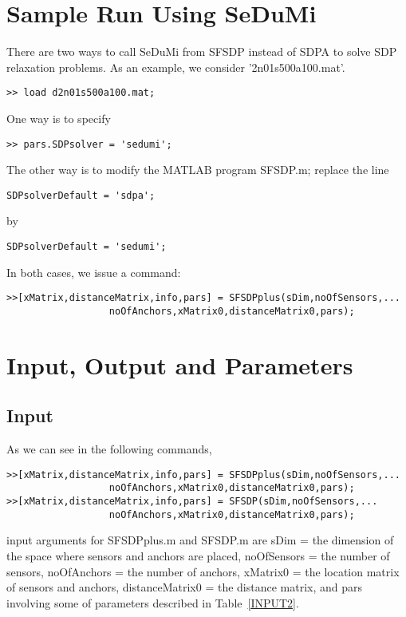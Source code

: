 \documentclass[12pt]{article}
\begin{document}
\section{Sample Run Using SeDuMi}
\label{SDPA}

There are two ways to call SeDuMi \cite{STURM99} from SFSDP instead of SDPA 
to solve SDP relaxation problems.  
As an example, we consider '2n01s500a100.mat'.
\begin{verbatim}
>> load d2n01s500a100.mat;
\end{verbatim}
One way is to specify 
\begin{verbatim}
>> pars.SDPsolver = 'sedumi'; 
\end{verbatim}
The other way is to modify the MATLAB program SFSDP.m;  replace the line 
\begin{verbatim}
SDPsolverDefault = 'sdpa';
\end{verbatim}
by 
\begin{verbatim}
SDPsolverDefault = 'sedumi';
\end{verbatim}
In both cases, we issue a command:
\begin{verbatim}
>>[xMatrix,distanceMatrix,info,pars] = SFSDPplus(sDim,noOfSensors,...
                  noOfAnchors,xMatrix0,distanceMatrix0,pars);
\end{verbatim}


\section{Input, Output and Parameters}
\label{IOP}

\subsection{Input}

As we can see in the following commands,
\begin{verbatim}
>>[xMatrix,distanceMatrix,info,pars] = SFSDPplus(sDim,noOfSensors,...
                  noOfAnchors,xMatrix0,distanceMatrix0,pars);
>>[xMatrix,distanceMatrix,info,pars] = SFSDP(sDim,noOfSensors,...
                  noOfAnchors,xMatrix0,distanceMatrix0,pars);
\end{verbatim}
 input arguments for SFSDPplus.m and SFSDP.m are 
sDim = the dimension of the space where sensors and anchors are placed, 
noOfSensors = the number of sensors, noOfAnchors = the number of anchors, 
xMatrix0 = the location matrix of sensors and anchors, 
distanceMatrix0 =  the distance matrix, and pars involving some of parameters described in 
Table~\ref{INPUT2}. 
\end{document}

